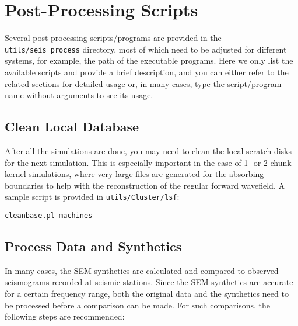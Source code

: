 \chapter{Post-Processing Scripts}

Several post-processing scripts/programs are provided in the \texttt{utils/seis\_process}
directory, most of which need to be adjusted for different
systems, for example, the path of the executable programs. Here we
only list the available scripts and provide a brief description, and
you can either refer to the related sections for detailed usage or,
in many cases, type the script/program name without arguments
to see its usage.


\section{Clean Local Database}

After all the simulations are done, you may need to clean the local
scratch disks for the next simulation. This is especially important
in the case of 1- or 2-chunk kernel simulations, where very large files
are generated for the absorbing boundaries to help with the reconstruction
of the regular forward wavefield. A sample script is provided in \texttt{utils/Cluster/lsf}:
\begin{verbatim}
cleanbase.pl machines
\end{verbatim}

\section{Process Data and Synthetics}\label{sec:Process-data-and-syn}

In many cases, the SEM synthetics are calculated and compared to observed
seismograms recorded at seismic stations. Since the SEM synthetics
are accurate for a certain frequency range, both the original data
and the synthetics need to be processed before a comparison can be
made. For such comparisons, the following steps are recommended:\newline

